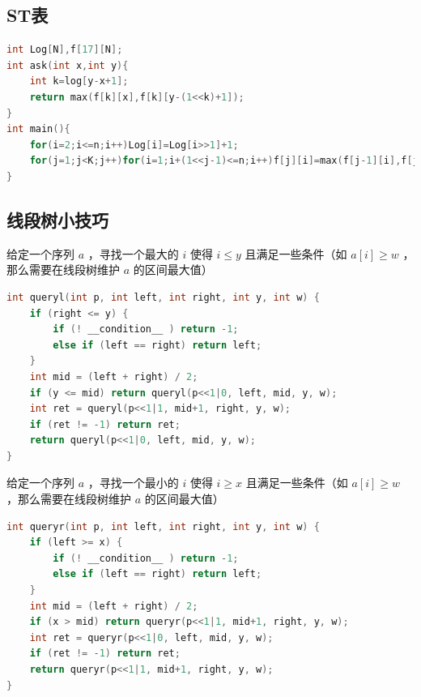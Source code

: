\documentclass{article}
\begin{document}
\subsection{ST表}
\begin{lstlisting}[language=C++]
int Log[N],f[17][N];
int ask(int x,int y){
	int k=log[y-x+1];
	return max(f[k][x],f[k][y-(1<<k)+1]);
}
int main(){
	for(i=2;i<=n;i++)Log[i]=Log[i>>1]+1;
	for(j=1;j<K;j++)for(i=1;i+(1<<j-1)<=n;i++)f[j][i]=max(f[j-1][i],f[j-1][i+(1<<j-1)]);
}
\end{lstlisting}
\subsection{线段树小技巧}
给定一个序列 $a$ ，寻找一个最大的 $i$ 使得 $i \leq y$ 且满足一些条件（如 $a[i] \geq w$ ，那么需要在线段树维护 $a$ 的区间最大值）
\begin{lstlisting}[language=C++]
int queryl(int p, int left, int right, int y, int w) {
	if (right <= y) {
		if (! __condition__ ) return -1;
		else if (left == right) return left;
	}
	int mid = (left + right) / 2;
	if (y <= mid) return queryl(p<<1|0, left, mid, y, w);
	int ret = queryl(p<<1|1, mid+1, right, y, w);
	if (ret != -1) return ret;
	return queryl(p<<1|0, left, mid, y, w);
}
\end{lstlisting}
给定一个序列 $a$ ，寻找一个最小的 $i$ 使得 $i \geq x$ 且满足一些条件（如 $a[i] \geq w$ ，那么需要在线段树维护 $a$ 的区间最大值）
\begin{lstlisting}[language=C++]
int queryr(int p, int left, int right, int y, int w) {
	if (left >= x) {
		if (! __condition__ ) return -1;
		else if (left == right) return left;
	}
	int mid = (left + right) / 2;
	if (x > mid) return queryr(p<<1|1, mid+1, right, y, w);
	int ret = queryr(p<<1|0, left, mid, y, w);
	if (ret != -1) return ret;
	return queryr(p<<1|1, mid+1, right, y, w);
}
\end{lstlisting}
\end{document}
